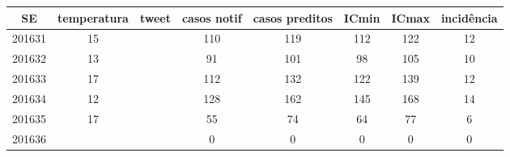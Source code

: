 \begin{tabular}{c|ccccccc}
  \hline
SE & temperatura & tweet & casos notif & casos preditos & ICmin & ICmax & incidência \\ 
  \hline
201631 & 15 &  & 110 & 119 & 112 & 122 & 12 \\ 
  201632 & 13 &  & 91 & 101 & 98 & 105 & 10 \\ 
  201633 & 17 &  & 112 & 132 & 122 & 139 & 12 \\ 
  201634 & 12 &  & 128 & 162 & 145 & 168 & 14 \\ 
  201635 & 17 &  & 55 & 74 & 64 & 77 & 6 \\ 
  201636 &  &  & 0 & 0 & 0 & 0 & 0 \\ 
   \hline
\end{tabular}
